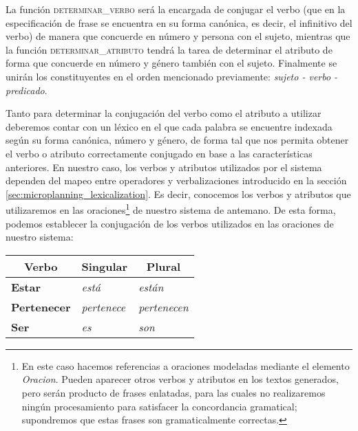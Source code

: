 La función \textsc{determinar\_verbo} será la encargada de conjugar el verbo (que en la especificación de frase se encuentra en su forma canónica, es decir, el infinitivo del verbo) de manera que concuerde en número y persona con el sujeto, mientras que la función \textsc{determinar\_atributo} tendrá la tarea de determinar el atributo de forma que concuerde en número y género también con el sujeto. Finalmente se unirán los constituyentes en el orden mencionado previamente: \emph{sujeto - verbo - predicado}.

Tanto para determinar la conjugación del verbo como el atributo a utilizar deberemos contar con un léxico en el que cada palabra se encuentre indexada según su forma canónica, número y género, de forma tal que nos permita obtener el verbo o atributo correctamente conjugado en base a las características anteriores. En nuestro caso, los verbos y atributos utilizados por el sistema dependen del mapeo entre operadores y verbalizaciones introducido en la sección \ref{sec:microplanning_lexicalization}. Es decir, conocemos los verbos y atributos que utilizaremos en las oraciones\footnote{En este caso hacemos referencias a oraciones modeladas mediante el elemento \textit{Oracion}. Pueden aparecer otros verbos y atributos en los textos generados, pero serán producto de frases enlatadas, para las cuales no realizaremos ningún procesamiento para satisfacer la concordancia gramatical; supondremos que estas frases son gramaticalmente correctas.} de nuestro sistema de antemano. De esta forma, podemos establecer la conjugación de los verbos utilizados en las oraciones de nuestro sistema:

\begin{table}[H]
\centering
\begin{tabular}{|l|l|l|}
\hline
\multicolumn{1}{|c|}{\textbf{Verbo}} & \multicolumn{1}{c|}{\textbf{Singular}} & \multicolumn{1}{c|}{\textbf{Plural}} \\ \hline
\textbf{Estar}                       & \textit{está}                                   & \textit{están}                                \\ \hline
\textbf{Pertenecer}                  & \textit{pertenece}                              & \textit{pertenecen}                           \\ \hline
\textbf{Ser}                         & \textit{es}                                     & \textit{son}                                  \\ \hline
\end{tabular}
\end{table}

